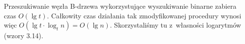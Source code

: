 
\exercise %
\exercise %
\exercise %
\exercise %
\exercise %
\exercise %
Przeszukiwanie węzła B-drzewa wykorzystujące wyszukiwanie binarne zabiera czas $O(\lg t)$.
Całkowity czas działania tak zmodyfikowanej procedury  wynosi więc $O(\lg t\cdot\log_tn)=O(\lg n)$.
Skorzystaliśmy tu z~własności logarytmów (wzory 3.14).

\exercise %
